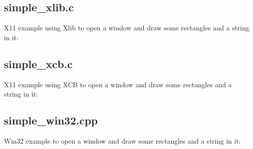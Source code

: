\documentclass{article}
\begin{document}
\subsection{simple\_xlib.c}
\label{subsec:simple_xlib.c}

X11 example using Xlib to open a window and draw some rectangles and a string
in it:



\subsection{simple\_xcb.c}
\label{subsec:simple_xcb.c}

X11 example using XCB to open a window and draw some rectangles and a string
in it:



\subsection{simple\_win32.cpp}
\label{subsec:simple_win32.cpp}

Win32 example to open a window and draw some rectangles and a string in it:


\end{document}
